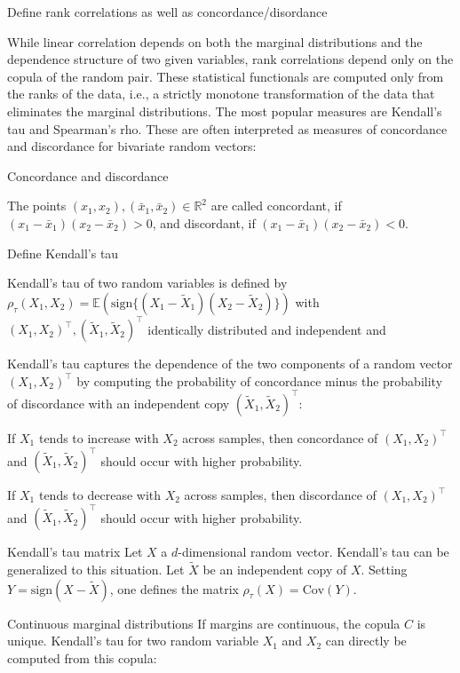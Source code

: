 Define rank correlations as well as concordance/disordance


While linear correlation depends on both the marginal distributions and the dependence structure of two given variables, rank correlations depend only on the copula of the random pair.
These statistical functionals are computed only from the ranks of the data, i.e., a strictly monotone transformation of the data that eliminates the marginal distributions.
The most popular measures are Kendall's tau and Spearman's rho.
These are often interpreted as measures of concordance and discordance for bivariate random vectors:
    
Concordance and discordance

The points \((x_1, x_2), (\bar{x}_1, \bar{x}_2) \in \mathbb{R}^2\) are called concordant, if
\((x_1 - \bar{x}_1)(x_2 - \bar{x}_2) > 0\),
and discordant, if
\((x_1 - \bar{x}_1)(x_2 - \bar{x}_2) < 0\).


Define Kendall's tau

Kendall's tau of two random variables is defined by
\(\rho_\tau(X_1, X_2) = \mathbb{E}(\text{sign}\{(X_1 - \tilde{X}_1)(X_2 - \tilde{X}_2)\})\)
with \((X_1, X_2)^\top, (\tilde{X}_1, \tilde{X}_2)^\top\) identically distributed and independent and

Kendall's tau captures the dependence of the two components of a random vector \((X_1, X_2)^\top\) by computing the probability of concordance minus the probability of discordance with an independent copy \((\tilde{X}_1, \tilde{X}_2)^\top\):
    
If \(X_1\) tends to increase with \(X_2\) across samples, then concordance of \((X_1, X_2)^\top\) and \((\tilde{X}_1, \tilde{X}_2)^\top\) should occur with higher probability.
    
If \(X_1\) tends to decrease with \(X_2\) across samples, then discordance of \((X_1, X_2)^\top\) and \((\tilde{X}_1, \tilde{X}_2)^\top\) should occur with higher probability.
    
Kendall's tau matrix
Let \(X\) a \(d\)-dimensional random vector. Kendall's tau can be generalized to this situation.
Let \(\tilde{X}\) be an independent copy of \(X\). Setting \(Y = \text{sign}(X - \tilde{X})\), one defines the matrix
\(\rho_\tau(X) = \text{Cov}(Y)\).

Continuous marginal distributions
If margins are continuous, the copula \(C\) is unique. Kendall's tau for two random variable \(X_1\) and \(X_2\) can directly be computed from this copula:


